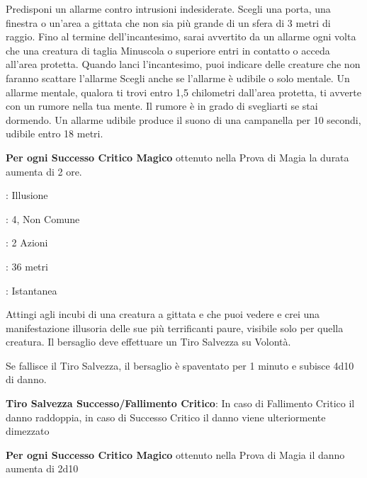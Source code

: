 \begin{multicols}{2}
Predisponi un allarme contro intrusioni indesiderate. Scegli una porta, una finestra o un'area a gittata che non sia più grande di un sfera di 3 metri di raggio. Fino al termine dell'incantesimo, sarai avvertito da un allarme ogni volta che una creatura di taglia Minuscola o superiore entri in contatto o acceda all'area protetta. Quando lanci l'incantesimo, puoi indicare delle creature che non faranno scattare l'allarme Scegli anche se l'allarme è udibile o solo mentale. Un allarme mentale, qualora ti trovi entro 1,5 chilometri dall'area protetta, ti avverte con un rumore nella tua mente. Il rumore è in grado di svegliarti se stai dormendo. Un allarme udibile produce il suono di una campanella per 10 secondi, udibile entro 18 metri.

\textbf{Per ogni Successo Critico Magico} ottenuto nella Prova di Magia la durata aumenta di 2 ore.

\noindent\colorbox{OBSSgold!10}{
\begin{minipage}{0.95\linewidth}
\begin{description}[noitemsep, topsep=0pt, parsep=0pt, partopsep=0pt, leftmargin=0cm, labelwidth=1.3cm]
\item[\textbf{Lista}]: Illusione
\item[\textbf{Livello}]: 4, Non Comune
\item[\textbf{Lancio}]: 2 Azioni
\item[\textbf{Gittata}]: 36 metri
\item[\textbf{Durata}]: Istantanea
\end{description}
\end{minipage}}\smallskip

Attingi agli incubi di una creatura a gittata e che puoi vedere e crei una manifestazione illusoria delle sue più terrificanti paure, visibile solo per quella creatura. Il bersaglio deve effettuare un Tiro Salvezza su Volontà.

Se fallisce il Tiro Salvezza, il bersaglio è spaventato per 1 minuto e subisce 4d10 di danno.

\textbf{Tiro Salvezza Successo/Fallimento Critico}: In caso di Fallimento Critico il danno raddoppia, in caso di Successo Critico il danno viene ulteriormente dimezzato

\textbf{Per ogni Successo Critico Magico} ottenuto nella Prova di Magia il danno aumenta di 2d10


\end{multicols}

